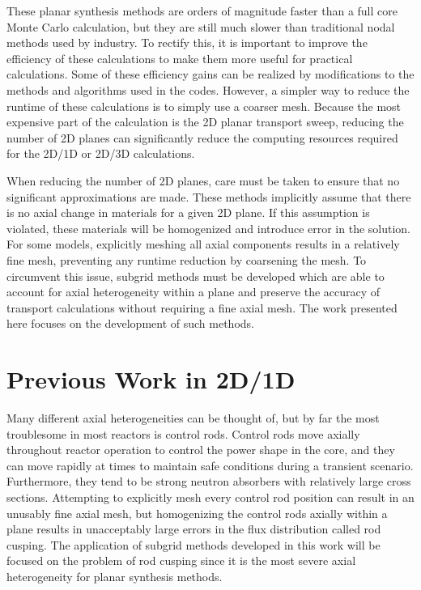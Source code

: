 These planar synthesis methods are orders of magnitude faster than a full core Monte Carlo calculation, but they are still much slower than traditional nodal methods used by industry.  To rectify this, it is important to improve the efficiency of these calculations to make them more useful for practical calculations.  Some of these efficiency gains can be realized by modifications to the methods and algorithms used in the codes.  However, a simpler way to reduce the runtime of these calculations is to simply use a coarser mesh.  Because the most expensive part of the calculation is the 2D planar transport sweep, reducing the number of 2D planes can significantly reduce the computing resources required for the 2D/1D or 2D/3D calculations.

When reducing the number of 2D planes, care must be taken to ensure that no significant approximations are made.  These methods implicitly assume that there is no axial change in materials for a given 2D plane.  If this assumption is violated, these materials will be homogenized and introduce error in the solution.  For some models, explicitly meshing all axial components results in a relatively fine mesh, preventing any runtime reduction by coarsening the mesh.  To circumvent this issue, subgrid methods must be developed which are able to account for axial heterogeneity within a plane and preserve the accuracy of transport calculations without requiring a fine axial mesh.  The work presented here focuses on the development of such methods.

\section{Previous Work in 2D/1D}

Many different axial heterogeneities can be thought of, but by far the most troublesome in most reactors is control rods.  Control rods move axially throughout reactor operation to control the power shape in the core, and they can move rapidly at times to maintain safe conditions during a transient scenario.  Furthermore, they tend to be strong neutron absorbers with relatively large cross sections.  Attempting to explicitly mesh every control rod position can result in an unusably fine axial mesh, but homogenizing the control rods axially within a plane results in unacceptably large errors in the flux distribution called rod cusping.  The application of subgrid methods developed in this work will be focused on the problem of rod cusping since it is the most severe axial heterogeneity for planar synthesis methods.

